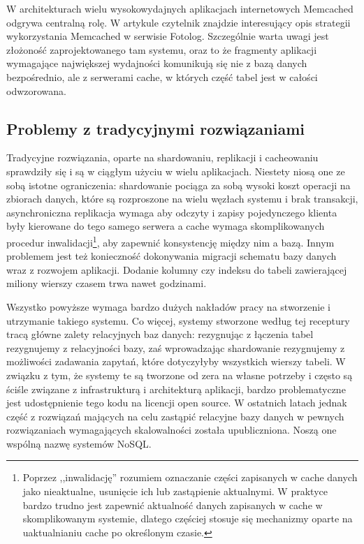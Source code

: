 W architekturach wielu wysokowydajnych aplikacjach internetowych Memcached odgrywa centralną rolę.
W artykule \cite{highscalability-mysql-memcached} czytelnik znajdzie interesujący opis strategii wykorzystania Memcached w serwisie Fotolog.
Szczególnie warta uwagi jest złożoność zaprojektowanego tam systemu, oraz to że fragmenty aplikacji wymagające największej wydajności komunikują się nie z bazą danych bezpośrednio, ale z serwerami cache, w których część tabel jest w całości odwzorowana.

\subsection{Problemy z tradycyjnymi rozwiązaniami}

Tradycyjne rozwiązania, oparte na shardowaniu, replikacji i cacheowaniu sprawdziły się i są w ciągłym użyciu w wielu aplikacjach.
Niestety niosą one ze sobą istotne ograniczenia: shardowanie pociąga za sobą wysoki koszt operacji na zbiorach danych, które są rozproszone na wielu węzłach systemu i brak transakcji, asynchroniczna replikacja wymaga aby odczyty i zapisy pojedynczego klienta były kierowane do tego samego serwera a cache wymaga skomplikowanych procedur inwalidacji\footnote{Poprzez ,,inwalidację'' rozumiem oznaczanie części zapisanych w cache danych jako nieaktualne, usunięcie ich lub zastąpienie aktualnymi. W praktyce bardzo trudno jest zapewnić aktualność danych zapisanych w cache w skomplikowanym systemie, dlatego częściej stosuje się mechanizmy oparte na uaktualnianiu cache po określonym czasie.}, aby zapewnić konsystencję między nim a bazą.
Innym problemem jest też konieczność dokonywania migracji schematu bazy danych wraz z rozwojem aplikacji.
Dodanie kolumny czy indeksu do tabeli zawierającej miliony wierszy czasem trwa nawet godzinami.

Wszystko powyższe wymaga bardzo dużych nakładów pracy na stworzenie i utrzymanie takiego systemu.
Co więcej, systemy stworzone według tej receptury tracą główne zalety relacyjnych baz danych: rezygnując z łączenia tabel rezygnujemy z relacyjności bazy, zaś wprowadzając shardowanie rezygnujemy z możliwości zadawania zapytań, które dotyczyłyby wszystkich wierszy tabeli.
W związku z tym, że systemy te są tworzone od zera na własne potrzeby i często są ściśle związane z infrastrukturą i architekturą aplikacji, bardzo problematyczne jest udostępnienie tego kodu na licencji open source.
W ostatnich latach jednak część z rozwiązań mających na celu zastąpić relacyjne bazy danych w pewnych rozwiązaniach wymagających skalowalności została upubliczniona.
Noszą one wspólną nazwę systemów NoSQL.

